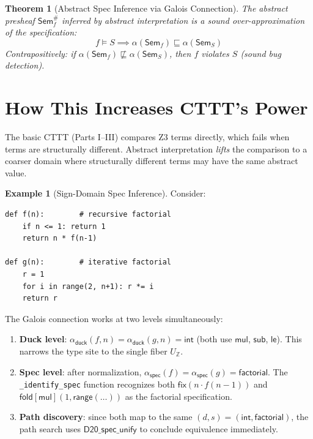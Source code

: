 \documentclass[11pt,a4paper]{report}
\theoremstyle{definition}
\newtheorem{example}[definition]{Example}
\theoremstyle{plain}
\newtheorem{theorem}[definition]{Theorem}
\newcommand{\Int}{\mathbb{Z}}
\newcommand{\fold}{\mathsf{fold}}
\newcommand{\Sem}{\mathsf{Sem}}
\begin{document}
\begin{theorem}[Abstract Spec Inference via Galois Connection]
\label{thm:abstract-spec}
The abstract presheaf $\Sem_f^\#$ inferred by abstract interpretation
is a \emph{sound over-approximation} of the specification:
\[
  f \models S \implies \alpha(\Sem_f) \sqsubseteq \alpha(\Sem_S)
\]
Contrapositively: if $\alpha(\Sem_f) \not\sqsubseteq \alpha(\Sem_S)$,
then $f$ violates $S$ (sound bug detection).
\end{theorem}

\section{How This Increases CTTT's Power}

The basic CTTT (Parts I--III) compares Z3 terms directly, which
fails when terms are structurally different.  Abstract interpretation
\emph{lifts} the comparison to a coarser domain where structurally
different terms may have the same abstract value.

\begin{example}[Sign-Domain Spec Inference]
Consider:
\begin{lstlisting}
def f(n):        # recursive factorial
    if n <= 1: return 1
    return n * f(n-1)

def g(n):        # iterative factorial
    r = 1
    for i in range(2, n+1): r *= i
    return r
\end{lstlisting}

The Galois connection works at two levels simultaneously:
\begin{enumerate}
  \item \textbf{Duck level}: $\alpha_\mathsf{duck}(f, n) =
    \alpha_\mathsf{duck}(g, n) = \mathsf{int}$ (both use
    $\mathsf{mul}$, $\mathsf{sub}$, $\mathsf{le}$).
    This narrows the type site to the single fiber $U_\Int$.
  \item \textbf{Spec level}: after normalization,
    $\alpha_\mathsf{spec}(f) = \alpha_\mathsf{spec}(g) =
    \mathsf{factorial}$.  The \texttt{\_identify\_spec}
    function recognizes both $\mathsf{fix}(n \cdot f(n-1))$
    and $\fold[\mathsf{mul}](1, \mathsf{range}(\ldots))$
    as the factorial specification.
  \item \textbf{Path discovery}: since both map to the same
    $(d, s) = (\mathsf{int}, \mathsf{factorial})$, the path search
    uses $\mathsf{D20\_spec\_unify}$ to conclude equivalence
    immediately.
\end{enumerate}
\end{example}
\end{document}
